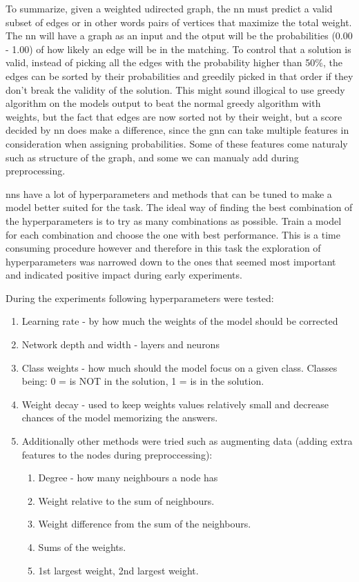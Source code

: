 To summarize, given a weighted udirected graph, the \gls{nn} must predict  a valid subset of edges or in other words pairs of vertices that maximize the total weight. The \gls{nn} will have a graph as an input and the otput will be the probabilities (0.00 - 1.00) of how likely an edge will be in the matching. To control that a solution is valid, instead of picking all the edges with the probability higher than 50\%, the edges can be sorted by their probabilities and greedily picked in that order if they don't break the validity of the solution. This might sound illogical to use greedy algorithm on the models output to beat the normal greedy algorithm with weights, but the fact that edges are now sorted not by their weight, but a score decided by \gls{nn} does make a difference, since the \gls{gnn} can take multiple features in consideration when assigning probabilities. Some of these features come naturaly such as structure of the graph, and some we can manualy add during preprocessing. 

\gls{nn}s have a lot of hyperparameters and methods that can be tuned to make a model better suited for the task. The ideal way of finding the best combination of the hyperparameters is to try as many combinations as possible. Train a model for each combination and choose the one with best performance. This is a time consuming procedure however and therefore in this task the exploration of hyperparameters was narrowed down to the ones that seemed most important and indicated positive impact during early experiments. 

During the experiments following hyperparameters were tested:
\begin{enumerate}
\item Learning rate - by how much the weights of the model should be corrected
\item Network depth and width - layers and neurons
\item Class weights - how much should the model focus on a given class. Classes being: 0 = is NOT in the solution, 1 = is in the solution.
\item Weight decay - used to keep weights values relatively small and decrease chances of the model memorizing the answers. 

\item Additionally other methods were tried such as augmenting data (adding extra features to the nodes during preproccessing): 
	\begin{enumerate}
	\item Degree - how many neighbours a node has
	\item Weight relative to the sum of neighbours.
	\item Weight difference from the sum of the neighbours.
	\item Sums of the weights. 
	\item 1st largest weight, 2nd largest weight.
	\end{enumerate}

\end{enumerate}

